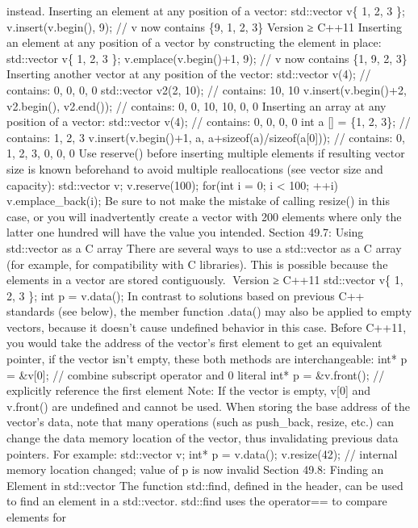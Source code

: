 {instead. Inserting an element at any position of a vector: std::vector
v\{ 1, 2, 3 \}; v.insert(v.begin(), 9); // v now contains \{9, 1, 2, 3\}
Version ≥ C++11 Inserting an element at any position of a vector by
constructing the element in place: std::vector v\{ 1, 2, 3 \};
v.emplace(v.begin()+1, 9); // v now contains \{1, 9, 2, 3\} Inserting
another vector at any position of the vector: std::vector v(4); //
contains: 0, 0, 0, 0 std::vector v2(2, 10); // contains: 10, 10
v.insert(v.begin()+2, v2.begin(), v2.end()); // contains: 0, 0, 10, 10,
0, 0 Inserting an array at any position of a vector: std::vector v(4);
// contains: 0, 0, 0, 0 int a {[}{]} = \{1, 2, 3\}; // contains: 1, 2, 3
v.insert(v.begin()+1, a, a+sizeof(a)/sizeof(a{[}0{]})); // contains: 0,
1, 2, 3, 0, 0, 0 Use reserve() before inserting multiple elements if
resulting vector size is known beforehand to avoid multiple
reallocations (see vector size and capacity): std::vector v;
v.reserve(100); for(int i = 0; i \textless{} 100; ++i)
v.emplace\_back(i); Be sure to not make the mistake of calling resize()
in this case, or you will inadvertently create a vector with 200
elements where only the latter one hundred will have the value you
intended. Section 49.7: Using std::vector as a C array There are several
ways to use a std::vector as a C array (for example, for compatibility
with C libraries). This is possible because the elements in a vector are
stored contiguously. Version ≥ C++11 std::vector v\{ 1, 2, 3 \}; int} p
= v.data(); In contrast to solutions based on previous C++ standards
(see below), the member function .data() may also be applied to empty
vectors, because it doesn't cause undeﬁned behavior in this case. Before
C++11, you would take the address of the vector's ﬁrst element to get an
equivalent pointer, if the vector isn't empty, these both methods are
interchangeable: int* p = \&v{[}0{]}; // combine subscript operator and
0 literal int* p = \&v.front(); // explicitly reference the first
element Note: If the vector is empty, v{[}0{]} and v.front() are
undeﬁned and cannot be used. When storing the base address of the
vector's data, note that many operations (such as push\_back, resize,
etc.) can change the data memory location of the vector, thus
invalidating previous data pointers. For example: std::vector v; int* p
= v.data(); v.resize(42); // internal memory location changed; value of
p is now invalid Section 49.8: Finding an Element in std::vector The
function std::find, deﬁned in the header, can be used to ﬁnd an element
in a std::vector. std::find uses the operator== to compare elements for
